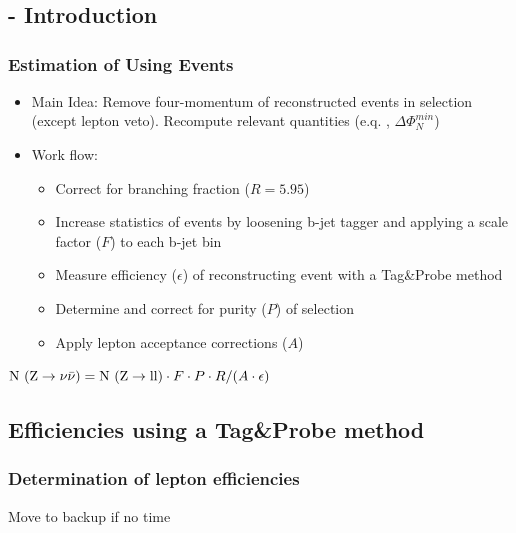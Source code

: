 \documentclass{beamer}
\begin{document}
\section{\ZInvJets}
\begin{frame}
  \begin{center}
    \huge\ZInvJets
    
  \end{center}
\end{frame}


\subsection{\Zll - Introduction}
\begin{frame}
\frametitle{Estimation of \ZInvJets  Using \Zll Events}
\begin{itemize}
 \item Main Idea: Remove four-momentum of reconstructed \Zll events in selection (except lepton veto). Recompute relevant quantities (e.q. \met, $\Delta\Phi_{N}^{min}$)
 \item Work flow:
 \begin{itemize}
  \item Correct for branching fraction ($R = 5.95$)
  \item Increase statistics of \Zll events by loosening b-jet tagger and applying a scale factor ($F$) to each b-jet bin
  \item Measure efficiency ($\epsilon$) of reconstructing \Zll event with a Tag\&Probe method
  \item Determine and correct for purity ($P$) of \Zll selection
  \item Apply lepton acceptance corrections ($A$)
 \end{itemize}
\end{itemize}
  \begin{centering}
  $\text{N }(\text{Z}\rightarrow\nu\bar{\nu}) = \text{N }(\text{Z}\rightarrow\text{ll})\cdot F \cdot P \cdot R / (A\cdot \epsilon)$
  \end{centering}
  \begin{block}{}
\centering
\end{block}
\end{frame}

\subsection{Efficiencies using a Tag\&Probe method }
\begin{frame}
 \frametitle{Determination of lepton efficiencies}
 Move to backup if no time
\end{frame}
\end{document}
